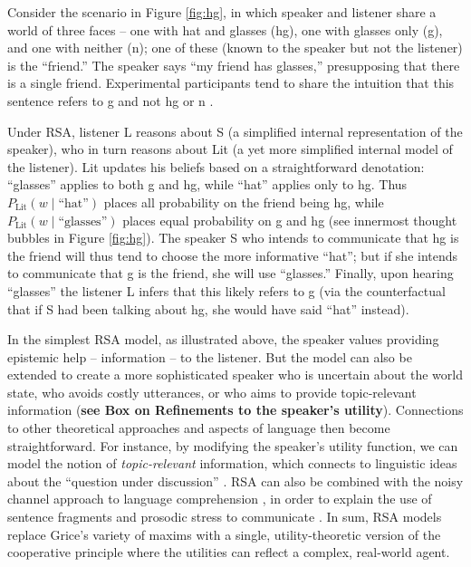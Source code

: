 \documentclass[]{elsarticle}
\begin{document}
Consider the scenario in Figure \ref{fig:hg}, in which speaker and listener share a
world of three faces -- one with hat and glasses ({\sc hg}), one with glasses
only ({\sc g}), and one with neither ({\sc n}); one of these (known to the speaker
but not the listener) is the ``friend.'' The speaker says ``my friend
has glasses,'' presupposing that there is a single friend. Experimental participants tend to share the intuition that this sentence refers to {\sc g} and not {\sc hg} or {\sc n} \citep{stiller2011,stiller2015}.

Under RSA, listener L reasons about S (a simplified
internal representation of the speaker), who in turn reasons about Lit
(a yet more simplified internal model of the listener). Lit updates his
beliefs based on a straightforward denotation: ``glasses'' applies to
both {\sc g} and {\sc hg}, while ``hat'' applies only to {\sc hg}. Thus
$P_{\text{Lit}}(w\mid \text{``hat''})$ places all probability on the friend
being {\sc hg}, while $P_{\text{Lit}}(w\mid \text{``glasses''})$ places equal probability on {\sc g} and {\sc hg} (see innermost thought bubbles in Figure \ref{fig:hg}). The speaker S who intends to communicate that {\sc hg} is the friend will thus tend to choose the more informative ``hat''; but if she intends to communicate that {\sc g} is the friend, she will use ``glasses.'' Finally, upon hearing ``glasses'' the listener L infers that this likely refers to {\sc g} (via the counterfactual that if S had been talking about {\sc hg}, she would have said ``hat'' instead).

In the simplest RSA model, as illustrated above, the speaker values
providing epistemic help -- information -- to the listener. But the model can also be extended to create a more sophisticated speaker who is uncertain
about the world state, who avoids costly utterances, or who aims to
provide topic-relevant information (\textbf{see Box on Refinements to the speaker's utility}). Connections to
other theoretical approaches and aspects of language then become
straightforward. For instance, by modifying the speaker's utility function, we can model the notion of \emph{topic-relevant} information, which
connects to linguistic ideas about the ``question under discussion''
\citep{roberts1996}. RSA can also be combined with the noisy
channel approach to language comprehension \citep{levy2008},
in order to explain the use of sentence fragments and prosodic stress to
communicate \citep{bergen2016}. In sum, RSA models
replace Grice's variety of maxims with a single, utility-theoretic
version of the cooperative principle where the utilities can reflect a
complex, real-world agent.
\end{document}
